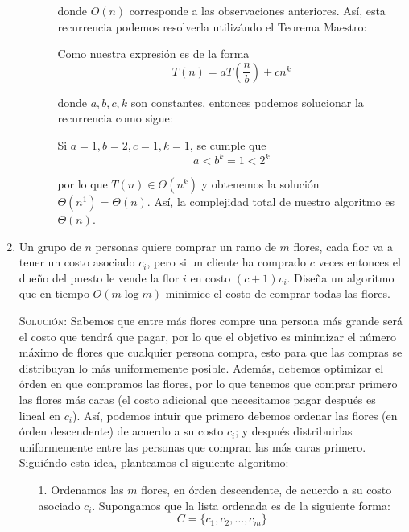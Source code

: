 \documentclass[letterpaper,11pt]{article}
\begin{document}
\begin{enumerate}
\begin{itemize}
\begin{itemize}
            donde $O(n)$ corresponde a las observaciones anteriores. Así, esta 
            recurrencia podemos resolverla utilizándo el Teorema Maestro: 
            
            Como nuestra expresión es de la forma 
            \begin{equation*}
                T(n) = aT \left( \frac{n}{b} \right) + cn^k 
            \end{equation*} 

            donde $a, b, c, k$ son constantes, entonces podemos solucionar 
            la recurrencia como sigue:

            Si $a = 1, b = 2, c = 1, k = 1$, se cumple que 
            \begin{equation*}
                a < b^k = 1 < 2^k
            \end{equation*} 
            
            por lo que $T(n) \in \Theta(n^k)$ y obtenemos la solución 
            $\Theta(n^1) = \Theta(n)$. Así, la complejidad total de nuestro 
            algoritmo es $\Theta(n)$. 
            
        \end{itemize}
    \end{itemize}

    \item Un grupo de $n$ personas quiere comprar un ramo de $m$ flores, cada 
    flor va a tener un costo asociado $c_i$, pero si un cliente ha comprado 
    $c$ veces entonces el dueño del puesto le vende la flor $i$ en costo 
    $(c + 1)v_i$. Diseña un algoritmo que en tiempo $O(m \log m)$ minimice el 
    costo de comprar todas las flores.

    \textsc{Solución:} Sabemos que entre más flores compre una persona más 
    grande será el costo que tendrá que pagar, por lo que el objetivo es 
    minimizar el número máximo de flores que cualquier persona compra, esto 
    para que las compras se distribuyan lo más uniformemente posible. 
    Además, debemos optimizar el órden en que compramos las flores, por lo 
    que tenemos que comprar primero las flores más caras (el costo adicional 
    que necesitamos pagar después es lineal en $c_i$). Así, podemos intuir 
    que primero debemos ordenar las flores (en órden descendente) de acuerdo 
    a su costo $c_i$; y después distribuirlas uniformemente entre las 
    personas que compran las más caras primero. Siguiéndo esta idea, planteamos 
    el siguiente algoritmo:
    \begin{itemize}
        \item[1.] Ordenamos las $m$ flores, en órden descendente, de acuerdo a 
        su costo asociado $c_i$. Supongamos que la lista ordenada es de la 
        siguiente forma:
        \begin{equation*}
            C = \{c_1, c_2, \ldots, c_m\}
        \end{equation*}


\end{itemize}
\end{enumerate}
\end{document}
